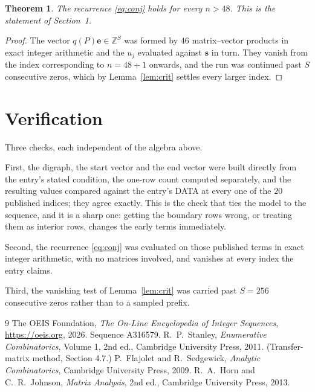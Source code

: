 \documentclass[11pt,a4paper]{article}
\theoremstyle{plain}
\newtheorem{theorem}{Theorem}
\theoremstyle{definition}
\begin{document}
\begin{theorem}
The recurrence \eqref{eq:conj} holds for every $n>48$. This is the statement of
Section~1.
\end{theorem}

\begin{proof}
The vector $q(P)\mathbf{e}\in\mathbb{Z}^{S}$ was formed by $46$ matrix--vector
products in exact integer arithmetic and the $u_j$ evaluated against $\mathbf{s}$ in turn.
They vanish from the index corresponding to $n=48+1$ onwards, and the run was continued
past $S$ consecutive zeros, which by Lemma~\ref{lem:crit} settles every larger index.
\end{proof}

\section{Verification}

Three checks, each independent of the algebra above.

First, the digraph, the start vector and the end vector were built directly from the
entry's stated condition, the one-row count computed separately, and the resulting values
compared against the entry's DATA at every one of the $20$ published indices; they
agree exactly. This is the check that ties the model to the sequence, and it is a sharp one:
getting the boundary rows wrong, or treating them as interior rows, changes the early terms
immediately.

Second, the recurrence \eqref{eq:conj} was evaluated on those published terms in exact
integer arithmetic, with no matrices involved, and vanishes at every index the entry claims.

Third, the vanishing test of Lemma~\ref{lem:crit} was carried past $S=256$ consecutive
zeros rather than to a sampled prefix.

\begin{thebibliography}{9}
 The OEIS Foundation, \emph{The On-Line Encyclopedia of Integer
Sequences}, \url{https://oeis.org}, 2026. Sequence A316579.
 R.~P.~Stanley, \emph{Enumerative Combinatorics}, Volume 1, 2nd ed.,
Cambridge University Press, 2011. (Transfer-matrix method, Section 4.7.)
 P.~Flajolet and R.~Sedgewick, \emph{Analytic Combinatorics}, Cambridge
University Press, 2009.
 R.~A.~Horn and C.~R.~Johnson, \emph{Matrix Analysis}, 2nd ed., Cambridge
University Press, 2013.
\end{thebibliography}
\end{document}
